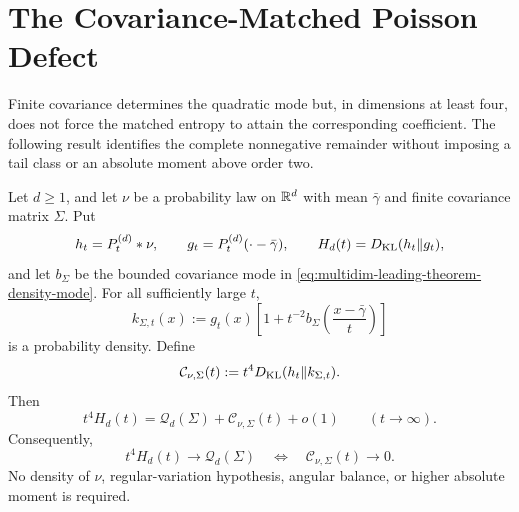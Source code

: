 \section{The Covariance-Matched Poisson Defect}
\label{sec:covariance-proxy-defect}

Finite covariance determines the quadratic mode but, in dimensions at least
four, does not force the matched entropy to attain the corresponding
coefficient.  The following result identifies the complete nonnegative
remainder without imposing a tail class or an absolute moment above order
two.

\begin{theorem}
\label{thm:covariance-proxy-defect-decomposition}
\label{thm:finite-covariance-proxy-defect-decomposition}
Let \(d\ge1\), and let \(\nu\) be a probability law on \(\mathbb{R}^d\) with mean
\(\bar\gamma\) and finite covariance matrix \(\Sigma\).  Put
\[
 h_t=P_t^{(d)}*\nu,
 \qquad g_t=P_t^{(d)}(\mathord\cdot-\bar\gamma),
 \qquad H_d(t)=D_{\rm KL}(h_t\|g_t),
\]
and let \(b_\Sigma\) be the bounded covariance mode in
\eqref{eq:multidim-leading-theorem-density-mode}.  For all sufficiently
large \(t\),
\begin{equation}\label{eq:covariance-poisson-proxy}
 k_{\Sigma,t}(x)
 :=g_t(x)\left[1+t^{-2}b_\Sigma
 \left(\frac{x-\bar\gamma}{t}\right)\right]
\end{equation}
is a probability density.  Define
\begin{equation}\label{eq:covariance-proxy-defect-functional}
 \mathcal C_{\nu,\Sigma}(t)
 :=t^4D_{\rm KL}(h_t\|k_{\Sigma,t}).
\end{equation}
Then
\begin{equation}\label{eq:covariance-proxy-defect-decomposition}
 t^4H_d(t)
 =\mathcal Q_d(\Sigma)+\mathcal C_{\nu,\Sigma}(t)+o(1)
 \qquad(t\to\infty).
\end{equation}
Consequently,
\begin{equation}\label{eq:covariance-proxy-defect-equivalence}
 t^4H_d(t)\longrightarrow\mathcal Q_d(\Sigma)
 \quad\Longleftrightarrow\quad
 \mathcal C_{\nu,\Sigma}(t)\longrightarrow0.
\end{equation}
No density of \(\nu\), regular-variation hypothesis, angular balance, or
higher absolute moment is required.
\end{theorem}

